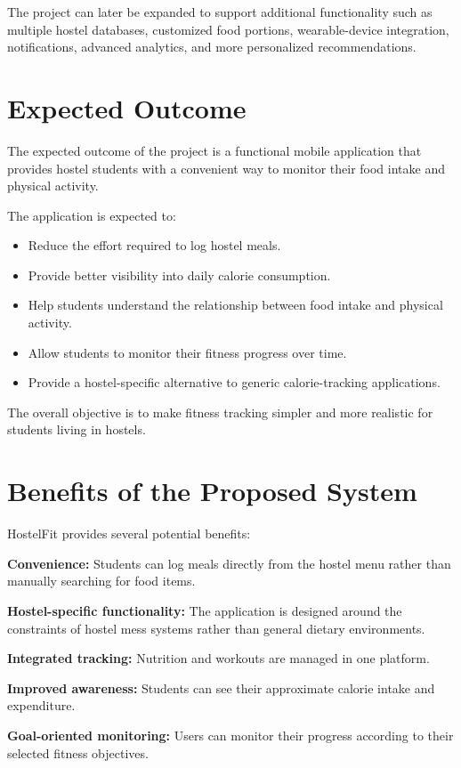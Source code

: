 \documentclass[11pt,a4paper]{article}
\begin{document}
The project can later be expanded to support additional functionality such as multiple hostel databases, customized food portions, wearable-device integration, notifications, advanced analytics, and more personalized recommendations.

\section{Expected Outcome}

The expected outcome of the project is a functional mobile application that provides hostel students with a convenient way to monitor their food intake and physical activity.

The application is expected to:
\begin{itemize}
    \item Reduce the effort required to log hostel meals.
    \item Provide better visibility into daily calorie consumption.
    \item Help students understand the relationship between food intake and physical activity.
    \item Allow students to monitor their fitness progress over time.
    \item Provide a hostel-specific alternative to generic calorie-tracking applications.
\end{itemize}

The overall objective is to make fitness tracking simpler and more realistic for students living in hostels.

\section{Benefits of the Proposed System}

HostelFit provides several potential benefits:

\textbf{Convenience:} Students can log meals directly from the hostel menu rather than manually searching for food items.

\textbf{Hostel-specific functionality:} The application is designed around the constraints of hostel mess systems rather than general dietary environments.

\textbf{Integrated tracking:} Nutrition and workouts are managed in one platform.

\textbf{Improved awareness:} Students can see their approximate calorie intake and expenditure.

\textbf{Goal-oriented monitoring:} Users can monitor their progress according to their selected fitness objectives.
\end{document}
